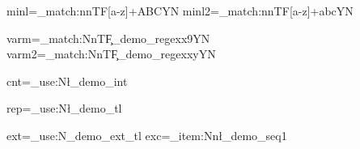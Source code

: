 \documentclass{article}
\begin{document}
minl=\ExplSyntaxOn\regex_match:nnTF{[a-z]+}{ABC}{Y}{N}\ExplSyntaxOff{}
minl2=\ExplSyntaxOn\regex_match:nnTF{[a-z]+}{abc}{Y}{N}\ExplSyntaxOff

varm=\ExplSyntaxOn\regex_match:NnTF\c_demo_regex{x9}{Y}{N}\ExplSyntaxOff{}
varm2=\ExplSyntaxOn\regex_match:NnTF\c_demo_regex{xy}{Y}{N}\ExplSyntaxOff

cnt=\ExplSyntaxOn\int_use:N\l_demo_int\ExplSyntaxOff

rep=\ExplSyntaxOn\tl_use:N\l_demo_tl\ExplSyntaxOff

ext=\ExplSyntaxOn\tl_use:N\g_demo_ext_tl\ExplSyntaxOff{}
exc=\ExplSyntaxOn\seq_item:Nn\l_demo_seq{1}\ExplSyntaxOff
\end{document}
